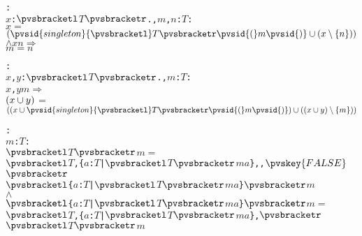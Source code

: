 \begin{alltt}
  : 
     \pvsid{(}\(x\): \({\pvsbracketl}\)\(T\)\({\pvsbracketr}\)., \(m\), \(n\): \(T\)\pvsid{)}:
      \(x\) \(=\) \(\setsotheruniontwofn{\pvsid{singleton}{\pvsbracketl}T{\pvsbracketr}\pvsid{(}m\pvsid{)}}{\setsotherremovetwofn{n}{x}}\) \(\wedge\) \(x\)\pvsid{(}\(n\)\pvsid{)} \(\Rightarrow\)
       \(m\) \(=\) \(n\)\vspace*{\pvsdeclspacing}

  : 
     \pvsid{(}\(x\), \(y\): \({\pvsbracketl}\)\(T\)\({\pvsbracketr}\)., \(m\): \(T\)\pvsid{)}:
      \pvsid{(}\(x\), \(y\)\pvsid{)}\pvsid{(}\(m\)\pvsid{)} \(\Rightarrow\)
       \(\setsotheruniontwofn{x}{y}\) \(=\)
        \(\setsotheruniontwofn{\setsotheruniontwofn{x}{\pvsid{singleton}{\pvsbracketl}T{\pvsbracketr}\pvsid{(}m\pvsid{)}}}{\setsotherremovetwofn{m}{\setsotheruniontwofn{x}{y}}}\)\vspace*{\pvsdeclspacing}

  : 
     \pvsid{(}\(m\): \(T\)\pvsid{)}:
      \({\pvsbracketl}\)\(T\)\({\pvsbracketr}\)\pvsid{(}\(m\)\pvsid{)} \(=\)
       \({\pvsbracketl}\)\(T\), \{\(a\): \(T\) | \({\pvsbracketl}\)\(T\)\({\pvsbracketr}\)\pvsid{(}\(m\)\pvsid{)}\pvsid{(}\(a\)\pvsid{)}\}, , \({\pvskey{FALSE}}\)\({\pvsbracketr}\)
           \pvsid{(}\({\pvsbracketl}\)\{\(a\): \(T\) | \({\pvsbracketl}\)\(T\)\({\pvsbracketr}\)\pvsid{(}\(m\)\pvsid{)}\pvsid{(}\(a\)\pvsid{)}\}\({\pvsbracketr}\)\pvsid{(}\(m\)\pvsid{)}\pvsid{)}
       \(\wedge\)
       \({\pvsbracketl}\)\{\(a\): \(T\) | \({\pvsbracketl}\)\(T\)\({\pvsbracketr}\)\pvsid{(}\(m\)\pvsid{)}\pvsid{(}\(a\)\pvsid{)}\}\({\pvsbracketr}\)\pvsid{(}\(m\)\pvsid{)} \(=\)
        \({\pvsbracketl}\)\(T\), \{\(a\): \(T\) | \({\pvsbracketl}\)\(T\)\({\pvsbracketr}\)\pvsid{(}\(m\)\pvsid{)}\pvsid{(}\(a\)\pvsid{)}\}, \({\pvsbracketr}\)
            \pvsid{(}\({\pvsbracketl}\)\(T\)\({\pvsbracketr}\)\pvsid{(}\(m\)\pvsid{)}\pvsid{)}\vspace*{\pvsdeclspacing}

  \end{alltt}
